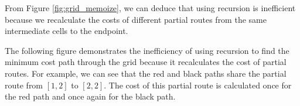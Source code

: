 \documentclass[11pt,addpoints,answers]{exam}
\begin{document}
\begin{questions}
\begin{parts}
\begin{subparts}
\begin{your_code_solution_outer}[height=1.75cm, width=\textwidth, title={Python code for missing field \textbf{(1)}}]
\begin{your_code_solution}
    \end{your_code_solution}
    \end{your_code_solution_outer}

    \begin{your_code_solution_outer}[height=1.75cm, width=\textwidth, title={Python code for missing field \textbf{(2)}}]
    \begin{your_code_solution}
    
    \end{your_code_solution}
    \end{your_code_solution_outer}

    \begin{your_code_solution_outer}[height=1.75cm, width=\textwidth, title={Python code for missing field \textbf{(3)}}]
    \begin{your_code_solution}
    
    \end{your_code_solution}
    \end{your_code_solution_outer}



\subpart[3] From Figure \ref{fig:grid_memoize}, we can deduce that using recursion is inefficient because we recalculate the costs of different partial routes from the same intermediate cells to the endpoint.

The following figure demonstrates the inefficiency of using recursion to find the minimum cost path through the grid because it recalculates the cost of partial routes. For example, we can see that the red and black paths share the partial route from $[1,2]$ to $[2,2]$. The cost of this partial route is calculated once for the red path and once again for the black path.


\end{subparts}
\end{parts}
\end{questions}
\end{document}
